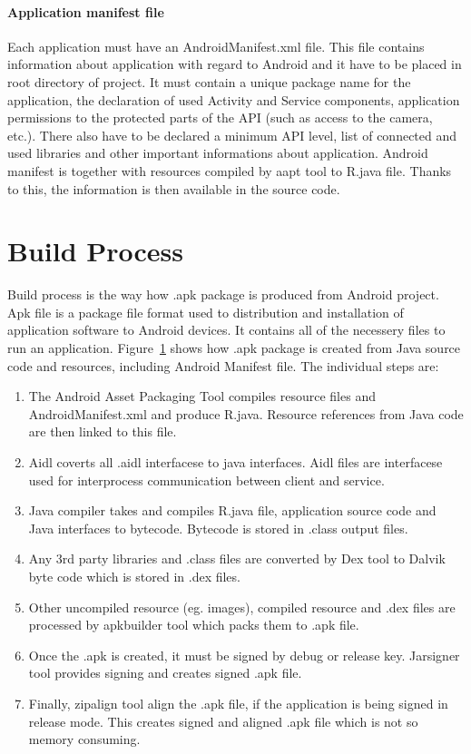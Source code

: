 \paragraph{Application manifest file}
Each application must have an AndroidManifest.xml file. This file contains information about application with regard to Android and it have to be placed in root directory of project. It must contain a unique package name for the application, the declaration of used Activity and Service components, application permissions to the protected parts of the API (such as access to the camera, etc.). There also have to be declared a minimum API level, list of connected and used libraries and other important informations about application. Android manifest is together with resources compiled by aapt tool to R.java file. Thanks to this, the information is then available in the source code.

\section{Build Process}\label{buildProcess}
Build process is the way how .apk package is produced from Android project. Apk file is a package file format used to distribution and installation of application software to Android devices. It contains all of the necessery files to run an application. Figure~\ref{buildProcess} shows how .apk package is created from Java source code and resources, including Android Manifest file. The individual steps are:

\begin{enumerate}
\item The Android Asset Packaging Tool compiles resource files and AndroidManifest.xml and produce R.java. Resource references from Java code are then linked to this file.
\item Aidl coverts all .aidl interfacese to java interfaces. Aidl files are interfacese used for interprocess communication between client and service.
\item Java compiler takes and compiles R.java file, application source code and Java interfaces to bytecode. Bytecode is stored in .class output files. 
\item Any 3rd party libraries and .class files are converted by Dex tool to Dalvik byte code which is stored in .dex files.
\item Other uncompiled resource (eg. images), compiled resource and .dex files are processed by apkbuilder tool which packs them to .apk file.
\item Once the .apk is created, it must be signed by debug or release key. Jarsigner tool provides signing and creates signed .apk file.
\item Finally, zipalign tool align the .apk file, if the application is being signed in release mode. This creates signed and aligned .apk file which is not so memory consuming.
\end{enumerate}

